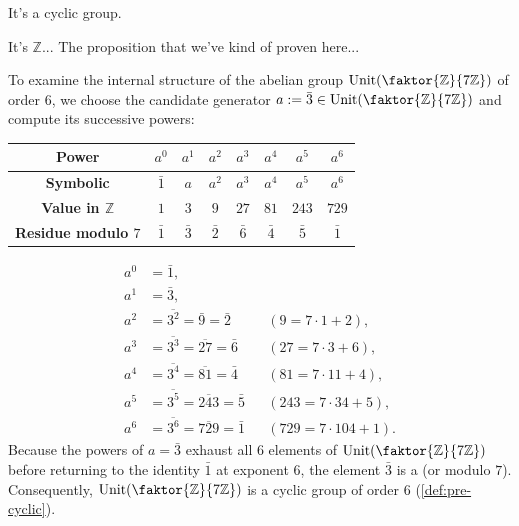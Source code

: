 \begin{student}
It's a cyclic group.
\end{student}

\begin{speech}[00:39:48 - 00:39:54]
It's $\mathbb{Z}$... The proposition that we've kind of proven here...
\end{speech}

\begin{content}[Powers of the Generator \texorpdfstring{$a = \bar{3}$}{a = 3} in \texorpdfstring{$\operatorname{Unit}(\faktor{\mathbb{Z}}{7\mathbb{Z}})$}{U(Z/7Z)}]
To examine the internal structure of the abelian group $\operatorname{Unit}(\faktor{\mathbb{Z}}{7\mathbb{Z}})$ of order $6$, we choose the candidate generator $a := \bar{3} \in \operatorname{Unit}(\faktor{\mathbb{Z}}{7\mathbb{Z}})$ and compute its successive powers:

\begin{center}
\begin{tabular}{c|ccccccc}
\toprule
\textbf{Power} & $a^0$ & $a^1$ & $a^2$ & $a^3$ & $a^4$ & $a^5$ & $a^6$ \\
\midrule
\textbf{Symbolic} & $\bar{1}$ & $a$ & $a^2$ & $a^3$ & $a^4$ & $a^5$ & $a^6$ \\
\textbf{Value in $\mathbb{Z}$} & $1$ & $3$ & $9$ & $27$ & $81$ & $243$ & $729$ \\
\textbf{Residue modulo $7$} & $\bar{1}$ & $\bar{3}$ & $\bar{2}$ & $\bar{6}$ & $\bar{4}$ & $\bar{5}$ & $\bar{1}$ \\
\bottomrule
\end{tabular}
\end{center}

\begin{steps}
\begin{align*}
    a^0 &= \bar{1}, \\
    a^1 &= \bar{3}, \\
    a^2 &= \overline{3^2} = \bar{9} = \bar{2} && (9 = 7 \cdot 1 + 2), \\
    a^3 &= \overline{3^3} = \overline{27} = \bar{6} && (27 = 7 \cdot 3 + 6), \\
    a^4 &= \overline{3^4} = \overline{81} = \bar{4} && (81 = 7 \cdot 11 + 4), \\
    a^5 &= \overline{3^5} = \overline{243} = \bar{5} && (243 = 7 \cdot 34 + 5), \\
    a^6 &= \overline{3^6} = \overline{729} = \bar{1} && (729 = 7 \cdot 104 + 1).
\end{align*}
Because the powers of $a = \bar{3}$ exhaust all $6$ elements of $\operatorname{Unit}(\faktor{\mathbb{Z}}{7\mathbb{Z}})$ before returning to the identity $\bar{1}$ at exponent $6$, the element $\bar{3}$ is a  (or  modulo $7$). Consequently, $\operatorname{Unit}(\faktor{\mathbb{Z}}{7\mathbb{Z}})$ is a cyclic group of order $6$ (\cref{def:pre-cyclic}).
\end{steps}
\end{content}

